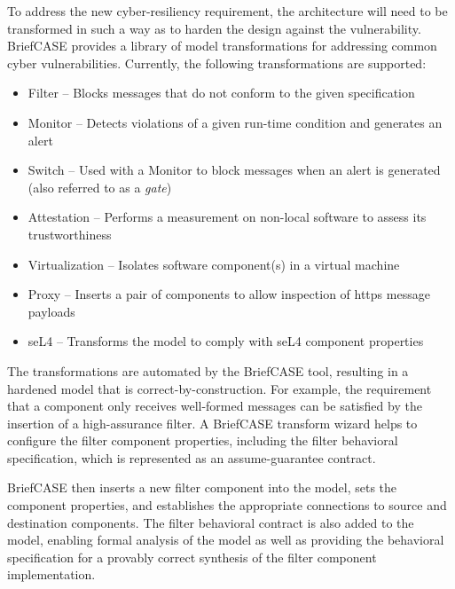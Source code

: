 To address the new cyber-resiliency requirement, the architecture will need to be transformed in such a way as to harden the design against the vulnerability.
BriefCASE provides a library of model transformations for addressing common cyber vulnerabilities.  Currently, the following transformations are supported:

\begin{itemize}
	\item Filter -- Blocks messages that do not conform to the given specification
	\item Monitor -- Detects violations of a given run-time condition and generates an alert
	\item Switch -- Used with a Monitor to block messages when an alert is generated (also referred to as a \textit{gate})
	\item Attestation -- Performs a measurement on non-local software to assess its trustworthiness
	\item Virtualization -- Isolates software component(s) in a virtual machine
	\item Proxy -- Inserts a pair of components to allow inspection of https message payloads
	\item seL4 -- Transforms the model to comply with seL4 component properties
\end{itemize}  

The transformations are automated by the BriefCASE tool, resulting in a hardened model that is correct-by-construction.  
For example, the requirement that a component only receives well-formed messages can be satisfied by the insertion of a high-assurance filter.  
A BriefCASE transform wizard 
helps to configure the filter component properties, including the filter behavioral specification, which is represented as an assume-guarantee contract.


BriefCASE then inserts a new filter component into the model, sets the component properties, and establishes the appropriate connections to source and destination components. The filter behavioral contract is also added to the model, enabling formal analysis of the model as well as providing the behavioral specification for a provably correct synthesis of the filter component implementation.

